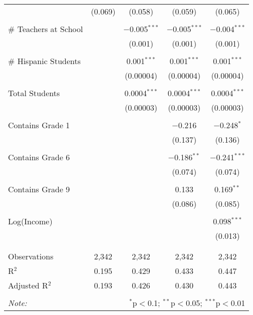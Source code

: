\begin{table}[!htbp]
\begin{tabular}{@{\extracolsep{-2pt}}lcccc}
  & (0.069) & (0.058) & (0.059) & (0.065) \\ 
  & & & & \\ 
 \# Teachers at School &  & $-$0.005$^{***}$ & $-$0.005$^{***}$ & $-$0.004$^{***}$ \\ 
  &  & (0.001) & (0.001) & (0.001) \\ 
  & & & & \\ 
 \# Hispanic Students &  & 0.001$^{***}$ & 0.001$^{***}$ & 0.001$^{***}$ \\ 
  &  & (0.00004) & (0.00004) & (0.00004) \\ 
  & & & & \\ 
 Total Students &  & 0.0004$^{***}$ & 0.0004$^{***}$ & 0.0004$^{***}$ \\ 
  &  & (0.00003) & (0.00003) & (0.00003) \\ 
  & & & & \\ 
 Contains Grade 1 &  &  & $-$0.216 & $-$0.248$^{*}$ \\ 
  &  &  & (0.137) & (0.136) \\ 
  & & & & \\ 
 Contains Grade 6 &  &  & $-$0.186$^{**}$ & $-$0.241$^{***}$ \\ 
  &  &  & (0.074) & (0.074) \\ 
  & & & & \\ 
 Contains Grade 9 &  &  & 0.133 & 0.169$^{**}$ \\ 
  &  &  & (0.086) & (0.085) \\ 
  & & & & \\ 
 Log(Income) &  &  &  & 0.098$^{***}$ \\ 
  &  &  &  & (0.013) \\ 
  & & & & \\ 
\hline \\[-1.8ex] 
Observations & 2,342 & 2,342 & 2,342 & 2,342 \\ 
R$^{2}$ & 0.195 & 0.429 & 0.433 & 0.447 \\ 
Adjusted R$^{2}$ & 0.193 & 0.426 & 0.430 & 0.443 \\ 
\hline 
\hline \\[-1.8ex] 
\textit{Note:}  & \multicolumn{4}{r}{$^{*}$p$<$0.1; $^{**}$p$<$0.05; $^{***}$p$<$0.01} \\ 
\end{tabular} 
\end{table} 
